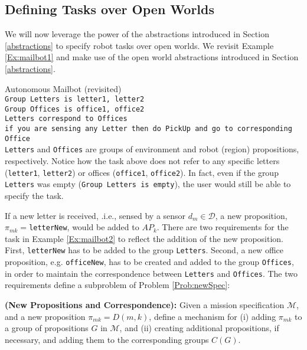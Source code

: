 \subsection{Defining Tasks over Open Worlds}

We will now leverage the power of the abstractions introduced in Section \ref{abstractions} to specify robot tasks over open worlds. We revisit Example \ref{Ex:mailbot1} and make use of the open world abstractions introduced in Section \ref{abstractions}.

\begin{myExample}\label{Ex:mailbot2} Autonomous Mailbot (revisited)\\
\texttt{Group Letters is letter1, letter2}\\
\texttt{Group Offices is office1, office2}\\
\texttt{Letters correspond to Offices}\\
\texttt{if you are sensing any Letter then do PickUp and go to corresponding Office}\\ 
\texttt{Letters} and \texttt{Offices} are groups of environment and robot (region) propositions, respectively. Notice how the task above does not refer to any specific letters (\texttt{letter1}, \texttt{letter2}) or offices (\texttt{office1}, \texttt{office2}). In fact, even if the group \texttt{Letters} was empty (\texttt{Group Letters is empty}), the user would still be able to specify the task.
\end{myExample}

If a new letter is received, .i.e., sensed by a sensor $d_{m} \in \mathcal{D}$, a new proposition, $\pi_{mk} = $\texttt{letterNew}, would be added to $AP_k$. There are two requirements for the task in Example \ref{Ex:mailbot2} to reflect the addition of the new proposition. First, \texttt{letterNew} has to be added to the group \texttt{Letters}. Second, a new office proposition, e.g. \texttt{officeNew}, has to be created and added to the group \texttt{Offices}, in order to maintain the correspondence between \texttt{Letters} and \texttt{Offices}. The two requirements define a subproblem of Problem \ref{Prob:newSpec}:

\begin{myProblem}\label{Prob:correspondence}
	\textbf{(New Propositions and Correspondence):} Given a mission specification $\mathcal{M}$, and a new proposition $\pi_{mk} = D(m, k)$, define a mechanism for (i) adding $\pi_{mk}$ to a group of propositions $G$ in $\mathcal{M}$, and (ii) creating additional propositions, if necessary, and adding them to the corresponding groups $C(G)$.
\end{myProblem}

